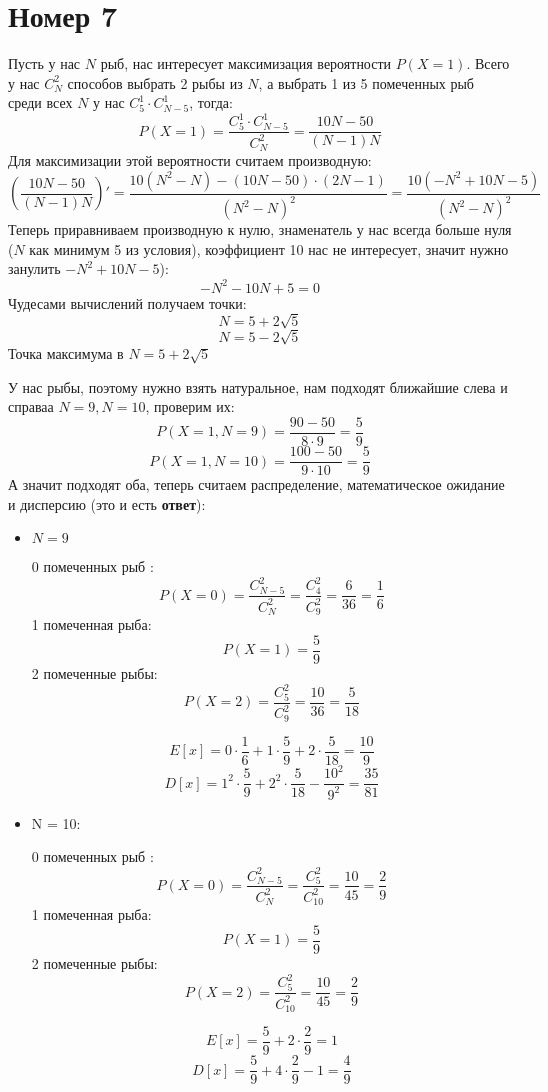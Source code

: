 \documentclass[a4paper,12pt]{article}
\begin{document}
\section*{Номер 7}
Пусть у нас $N$ рыб, нас интересует максимизация вероятности $P(X = 1)$. Всего у нас $C_N^2$ способов выбрать 2 рыбы из $N$, а выбрать 1 из 5 помеченных рыб среди всех $N$ у нас $C_5^1 \cdot C^1_{N - 5}$, тогда:
\[
P(X = 1) = \frac{C_5^1 \cdot C^1_{N - 5}}{C_N^2} = \frac{10N - 50}{(N - 1)N}
\]
Для максимизации этой вероятности считаем производную:
\[
\left(\frac{10N - 50}{(N - 1)N}\right)' = \frac{10(N^2 - N) - (10N - 50) \cdot (2N - 1)}{(N^2 - N)^2} = \frac{10(-N^2 +10N -5)}{(N^2 - N)^2}
\]
Теперь приравниваем производную к нулю, знаменатель у нас всегда больше нуля ($N$ как минимум 5 из условия), коэффициент 10 нас не интересует, значит нужно занулить $-N^2 + 10N - 5$):
\[-
N^2 -  10N + 5 = 0
\]
Чудесами вычислений получаем точки:
\[
N = 5 + 2\sqrt{5}
\]
\[
N = 5 - 2 \sqrt{5}
\]
Точка максимума в $N = 5 + 2 \sqrt{5}$


У нас рыбы, поэтому нужно взять натуральное, нам подходят ближайшие слева и справаа $N = 9, N = 10$, проверим их:
\[
P(X = 1, N = 9) = \frac{90 - 50}{8 \cdot 9 } = \frac59
\]
\[
P(X = 1, N = 10) = \frac{100 - 50}{9 \cdot 10 } = \frac59
\]
А значит подходят оба, теперь считаем распределение, математическое ожидание и дисперсию (это и есть \textbf{ответ}):
\begin{itemize}
\item $N = 9$
\begin{center}
0 помеченных рыб :
\[
P(X = 0) = \frac{C_{N-5}^2}{C_N^2} = \frac{C^2_4}{C^2_9} = \frac{6}{36} =  \frac{1}{6}
\]
1 помеченная рыба:
\[
P(X = 1) = \frac{5}{9}
\]
2 помеченные рыбы:
\[
P(X = 2) = \frac{C^2_5}{C^2_9} = \frac{10}{36} = \frac{5}{18}
\]
\end{center}
\[
E[x] = 0 \cdot \frac16 + 1 \cdot \frac59 + 2 \cdot \frac{5}{18} = \frac{10}{9}
\]
\[
D[x] = 1^2 \cdot \frac59 + 2^2 \cdot \frac{5}{18} - \frac{10^2}{9^2} = \frac{35}{81}
\]
\clearpage
\item N = 10:
\begin{center}
0 помеченных рыб :
\[
P(X = 0) = \frac{C_{N-5}^2}{C_N^2} = \frac{C^2_5}{C^2_{10}} = \frac{10}{45} = \frac{2}{9}
\]
1 помеченная рыба:
\[
P(X = 1) = \frac{5}{9}
\]
2 помеченные рыбы:
\[
P(X = 2) = \frac{C^2_5}{C^2_{10}} = \frac{10}{45} = \frac{2}{9}
\]
\end{center}
\[
E[x] = \frac{5}{9} + 2 \cdot \frac29 = 1
\]
\[
D[x] = \frac{5}{9} + 4 \cdot \frac{2}{9} - 1 = \frac{4}{9}
\]
\end{itemize}
\end{document}
